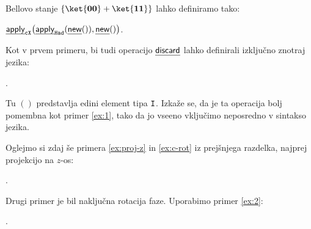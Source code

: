 \begin{example*}\label{ex:3}
    Bellovo stanje \(\state{\ket{\mb{00}} + \ket{\mb{11}}}\) lahko definiramo tako:
    \begin{center}
        \(\eff{apply}_{\ctl X}{\p{\eapply{\had}{\enew}, \enew}}\).
    \end{center}
\end{example*}

\begin{example*}\label{ex:4}
    Kot v prvem primeru, bi tudi operacijo \(\eff{discard}\) lahko definirali izključno znotraj jezika:
    \begin{center}
        .
    \end{center}
    Tu \(()\) predstavlja edini element tipa \(\text{\ttfamily I}\).
    Izkaže se, da je ta operacija bolj pomembna kot primer \ref{ex:1}, tako da jo vseeno vključimo neposredno v sintakso jezika.
\end{example*}

\begin{example*}\label{ex:5}
    Oglejmo si zdaj še primera \ref{ex:proj-z} in \ref{ex:c-rot} iz prejšnjega razdelka, najprej projekcijo na \(z\)-os:
    \begin{center}
        .
    \end{center}
\end{example*}

\begin{example*}\label{ex:6}
    Drugi primer je bil naključna rotacija faze. Uporabimo primer \ref{ex:2}:
    \begin{center}
        .
    \end{center}
\end{example*}

